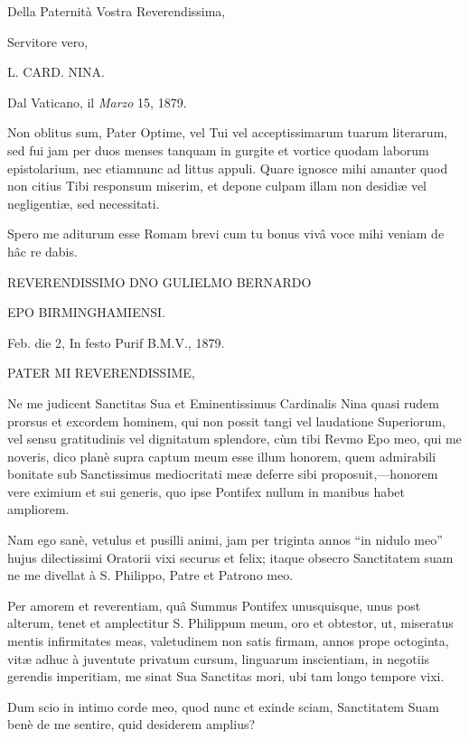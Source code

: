 Della Paternità Vostra Reverendissima,

Servitore vero,

L. CARD. NINA.

Dal Vaticano, il \emph{Marzo} 15, 1879.


Non oblitus sum, Pater Optime, vel Tui vel acceptissimarum tuarum
literarum, sed fui jam per duos menses tanquam in gurgite et
vortice quodam laborum epistolarium, nec etiamnunc ad littus appuli.
Quare ignosce mihi amanter quod non citius Tibi responsum miserim, et
depone culpam illam non desidiæ vel negligentiæ, sed necessitati.

Spero me aditurum esse Romam brevi cum tu bonus vivâ voce mihi
veniam de hâc re dabis.


REVERENDISSIMO DNO
GULIELMO BERNARDO

EPO BIRMINGHAMIENSI.

Feb. die 2, In festo Purif B.M.V., 1879.

PATER MI REVERENDISSIME,

Ne me judicent Sanctitas Sua et Eminentissimus Cardinalis Nina quasi
rudem prorsus et excordem hominem, qui non possit tangi vel laudatione
Superiorum, vel sensu gratitudinis vel dignitatum splendore, cùm tibi
Revmo Epo meo, qui me noveris, dico planè supra
captum meum esse illum honorem, quem admirabili bonitate sub
Sanctissimus mediocritati meæ deferre sibi proposuit,—honorem vere
eximium et sui generis, quo ipse Pontifex nullum in manibus habet
ampliorem.

Nam ego sanè, vetulus et pusilli animi, jam per triginta annos
``in nidulo meo'' hujus dilectissimi Oratorii vixi securus et
felix; itaque obsecro Sanctitatem suam ne me divellat à S. Philippo,
Patre et Patrono meo.

Per amorem et reverentiam, quâ Summus Pontifex unusquisque, unus
post alterum, tenet et amplectitur S. Philippum meum, oro et obtestor,
ut, miseratus mentis infirmitates meas, valetudinem non satis firmam,
annos prope octoginta, vitæ adhuc à juventute privatum cursum,
linguarum inscientiam, in negotiis gerendis imperitiam, me sinat Sua
Sanctitas mori, ubi tam longo tempore vixi.

Dum scio in intimo corde meo, quod nunc et exinde sciam,
Sanctitatem Suam benè de me sentire, quid desiderem amplius?

